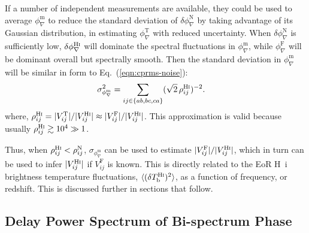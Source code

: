 \documentclass[
reprint,
superscriptaddress,
amsmath,
amssymb,
aps,
prd
]{revtex4-1}
\begin{document}
If a number of independent measurements are available, they could be used to average $\phi_\nabla^\textrm{m}$ to reduce the standard deviation of $\delta\phi_\nabla^\textrm{N}$ by taking advantage of its Gaussian distribution, in estimating $\phi_\nabla^\textrm{T}$ with reduced uncertainty. When $\delta\phi_\nabla^\textrm{N}$ is sufficiently low, $\delta\phi_\nabla^\textrm{H{\sc i}}$ will dominate the spectral fluctuations in $\phi_\nabla^\textrm{m}$, while $\phi_\nabla^\textrm{F}$ will be dominant overall but spectrally smooth. Then the standard deviation in $\phi_\nabla^\textrm{m}$ will be similar in form to Eq.~(\ref{eqn:cprms-noise}):
\begin{align}
  \sigma_{\phi_\nabla^\textrm{m}}^2 &= \sum_{ij\in{\{ab,bc,ca\}}} (\sqrt{2}\,\rho_{ij}^\textrm{H{\sc i}})^{-2}. \label{eqn:cprms-EoR}
\end{align}
where, $\rho_{ij}^\textrm{H{\sc i}} = |V_{ij}^\textrm{T}|/|V_{ij}^\textrm{H{\sc i}}| \approx |V_{ij}^\textrm{F}|/|V_{ij}^\textrm{H{\sc i}}|$. This approximation is valid because usually $\rho_{ij}^\textrm{H{\sc i}} \gtrsim 10^4 \gg 1$. 

Thus, when $\rho_{ij}^\textrm{H{\sc i}} < \rho_{ij}^\textrm{N}$, $\sigma_{\phi_\nabla^\textrm{m}}$ can be used to estimate $|V_{ij}^\textrm{F}|/|V_{ij}^\textrm{H{\sc i}}|$, which in turn can be used to infer $|V_{ij}^\textrm{H{\sc i}}|$ if $V_{ij}^\textrm{F}$ is known. This is directly related to the EoR H~{\sc i} brightness temperature fluctuations, $\langle(\delta T_\textrm{b}^\textrm{H{\sc i}})^2\rangle$, as a function of frequency, or redshift. This is discussed further in sections that follow. %


\subsection{Delay Power Spectrum of Bi-spectrum Phase}\label{sec:cp-FG-wedge}
\end{document}
